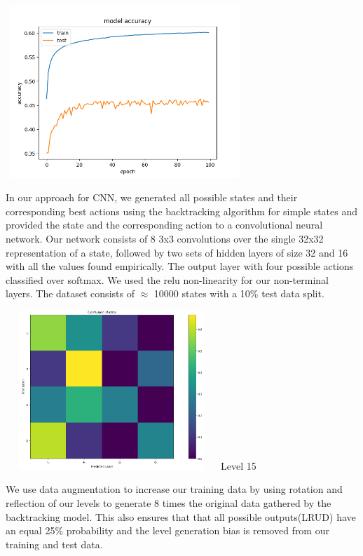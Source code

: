 \documentclass[10pt, final]{article}
\newcommand{\br}[1][.75]{\ \\[#1\baselineskip]}
\begin{document}
\begin{multicols}{2}
\begin{center}
\end{center}
			\begin{center}
		\includegraphics[width=9cm, height=6.5cm]{Accuracy.png}
	\end{center}
	In our approach for CNN, we generated all possible states and their corresponding best actions using the backtracking algorithm for simple states and provided the state and the corresponding action to a convolutional neural network. 
	Our network consists of 8 3x3 convolutions over the single 32x32 representation of a state, followed by two sets of hidden layers of size 32 and 16  with all the values found empirically. The output layer with four possible actions classified over softmax. We used the relu non-linearity for our non-terminal layers. The dataset consists of $\approx$ 10000 states with a 10\% test data split. \br
			\begin{center}
		\includegraphics[width=8cm, height=6cm]{conf.png}
		{Level 15}
	\end{center}
	We use data augmentation to increase our training data by using rotation and reflection of our levels to generate 8 times the original data gathered by the backtracking model. This also ensures that that all possible outputs(LRUD) have an equal 25\% probability and the level generation bias is removed from our training and test data.

\end{multicols}
\end{document}
